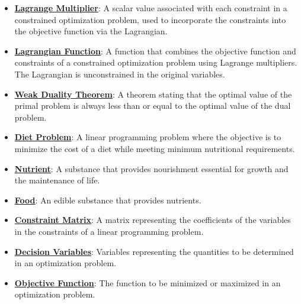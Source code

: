 \documentclass{article}%
\begin{document}
\begin{itemize}[leftmargin=*]%
\item \href{https://www.math.purdue.edu/~yipn/421/2024-09-17-DualityGeneral.pdf#page=2}{\textbf{Lagrange Multiplier}}: A scalar value associated with each constraint in a constrained optimization problem, used to incorporate the constraints into the objective function via the Lagrangian.%
\item \href{https://www.math.purdue.edu/~yipn/421/2024-09-17-DualityGeneral.pdf#page=2}{\textbf{Lagrangian Function}}: A function that combines the objective function and constraints of a constrained optimization problem using Lagrange multipliers. The Lagrangian is unconstrained in the original variables.%
\item \href{https://www.math.purdue.edu/~yipn/421/2024-09-17-DualityGeneral.pdf#page=5}{\textbf{Weak Duality Theorem}}: A theorem stating that the optimal value of the primal problem is always less than or equal to the optimal value of the dual problem.%
\end{itemize}%
\begin{itemize}[leftmargin=*]%
\item \href{https://www.math.purdue.edu/~yipn/421/2024-09-19-DualityExamples.pdf#page=2}{\textbf{Diet Problem}}: A linear programming problem where the objective is to minimize the cost of a diet while meeting minimum nutritional requirements.%
\item \href{https://www.math.purdue.edu/~yipn/421/2024-09-19-DualityExamples.pdf#page=2}{\textbf{Nutrient}}: A substance that provides nourishment essential for growth and the maintenance of life.%
\item \href{https://www.math.purdue.edu/~yipn/421/2024-09-19-DualityExamples.pdf#page=2}{\textbf{Food}}: An edible substance that provides nutrients.%
\item \href{https://www.math.purdue.edu/~yipn/421/2024-09-19-DualityExamples.pdf#page=1}{\textbf{Constraint Matrix}}: A matrix representing the coefficients of the variables in the constraints of a linear programming problem.%
\item \href{https://www.math.purdue.edu/~yipn/421/2024-09-19-DualityExamples.pdf#page=1}{\textbf{Decision Variables}}: Variables representing the quantities to be determined in an optimization problem.%
\item \href{https://www.math.purdue.edu/~yipn/421/2024-09-19-DualityExamples.pdf#page=1}{\textbf{Objective Function}}: The function to be minimized or maximized in an optimization problem.%
\end{itemize}%
\end{document}
